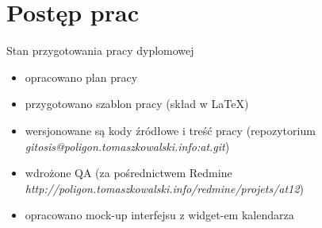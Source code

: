 \section{Postęp prac}

\begin{frame}{Stan przygotowania pracy dyplomowej}
    \begin{itemize}
    \item opracowano plan pracy
    \item przygotowano szablon pracy (skład w \LaTeX)
    \item wersjonowane są kody źródłowe i treść pracy 
          {\footnotesize (repozytorium \textsl{gitosis@poligon.tomaszkowalski.info:at.git}) }
    \item wdrożone QA {\footnotesize (za pośrednictwem Redmine \textsl{http://poligon.tomaszkowalski.info/redmine/projets/at12}) }
    \item opracowano mock-up interfejsu z widget-em kalendarza
    \end{itemize}
\end{frame}



